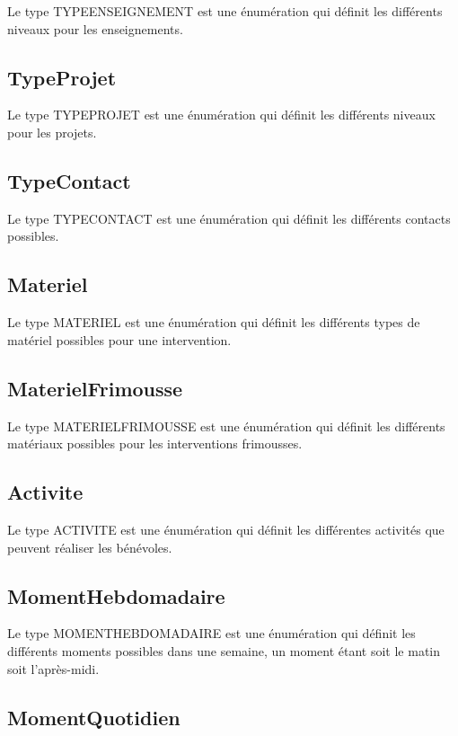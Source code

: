 \documentclass[asi, sansVersion]{picInsa}
\begin{document}
Le type TYPEENSEIGNEMENT est une énumération qui définit les différents niveaux pour les enseignements.

\subsection*{TypeProjet}

Le type TYPEPROJET est une énumération qui définit les différents niveaux pour les projets.

\subsection*{TypeContact}

Le type TYPECONTACT est une énumération qui définit les différents contacts possibles.

\subsection*{Materiel}

Le type MATERIEL est une énumération qui définit les différents types de matériel possibles pour une intervention.

\subsection*{MaterielFrimousse}

Le type MATERIELFRIMOUSSE est une énumération qui définit les différents matériaux possibles pour les interventions frimousses.

\subsection*{Activite}

Le type ACTIVITE est une énumération qui définit les différentes activités que peuvent réaliser les bénévoles.

\subsection*{MomentHebdomadaire}

Le type MOMENTHEBDOMADAIRE est une énumération qui définit les différents moments possibles dans une semaine, un moment étant soit le matin soit l'après-midi.

\subsection*{MomentQuotidien}
\end{document}
